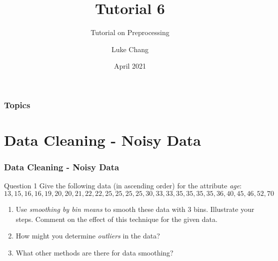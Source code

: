 \documentclass[aspectratio=169, 10pt]{beamer}
\title{Tutorial 6}
\subtitle{Tutorial on Preprocessing}
\author{Luke Chang}
\institute{The University of Auckland}
\date{April 2021}
\begin{document}
\frame{\titlepage}

\begin{frame}
    \frametitle{Topics}

    \tableofcontents
        
\end{frame}

\section{Data Cleaning - Noisy Data}
\begin{frame}[t]
    \frametitle{Data Cleaning - Noisy Data}

    \begin{block}{Question 1}
        Give the following data (in ascending order) for the attribute \textit{age}: 
        \[13,15,16,16,19,20,20,21,22,22,25,25,25,25,30,33,33,35,35,35,35,36,40,45,46,52,70\]
    \end{block}

    \begin{enumerate}
        \item Use \textit{smoothing by bin means} to smooth these data with 3 bins. 
        Illustrate your steps. Comment on the effect of this technique for the given data.
        \item How might you determine \textit{outliers} in the data?
        \item What other methods are there for data smoothing?
    \end{enumerate}

\end{frame}
\end{document}
